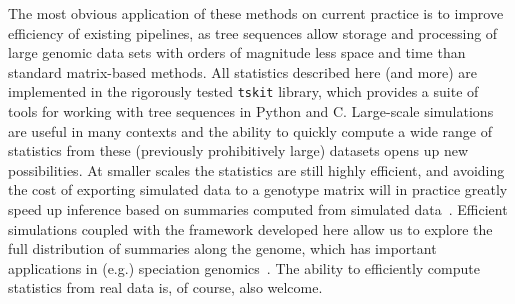 \documentclass{article}
\newcommand{\tskit}{{\texttt{tskit}}}
\begin{document}
The most obvious application of these methods on current practice
is to improve efficiency of existing pipelines,
as tree sequences allow storage and processing of large genomic data sets
with orders of magnitude less space and time than standard matrix-based methods.
All statistics described here (and more) are implemented
in the rigorously tested \tskit{} library,
which provides a suite of tools for working with tree sequences in Python and C.
Large-scale simulations are useful in many contexts
\citep[e.g.,][]{martin2017human,browning2018one,galloway2019stickleback}
and the ability to quickly compute a wide range of statistics from
these (previously prohibitively large) datasets opens up new possibilities.
At smaller scales the statistics are still highly efficient, and avoiding
the cost of exporting simulated data to a genotype matrix will in practice greatly
speed up inference based on summaries computed from simulated
data~\citep{beaumont2002approximate,csillery2010approximate,schrider2018supervised}.
Efficient simulations coupled with the framework developed here allow us to
explore the full distribution of summaries along the genome, which has
important applications in (e.g.) speciation genomics~\citep{lohse2017come}.
The ability to efficiently compute statistics from real data is, of course, also welcome.
\end{document}
